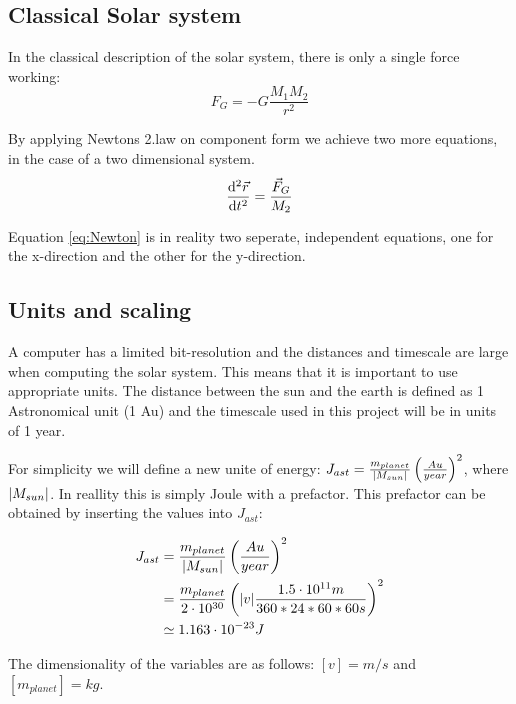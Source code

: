 






\subsection{Classical Solar system}
In the classical description of the solar system, there is only a single force working:
\begin{equation}
 F_G = - G\frac{M_{1}M_2}{r ^2} \label{eq:F_G}
\end{equation}

By applying Newtons 2.law on component form we achieve two more equations, in the case of a two dimensional system. 
\begin{equation}
\dv[2]{\vec{r	}}{t} = \frac{\vec{F}_G}{M_2} \label{eq:Newton}
\end{equation}

Equation \ref{eq:Newton} is in reality two seperate, independent equations, one for the x-direction and the other for the y-direction. 
 


\subsection{Units and scaling}

A computer has a limited bit-resolution and the distances and timescale are large when computing the solar system. This means that it is important to use appropriate units. The distance between the sun and the earth is defined as 1 Astronomical unit (1 Au) and the timescale used in this project will be in units of 1 year. 


For simplicity we will define a new unite of energy: $ J_{ast}  = \frac{m_{planet}}{\abs{M_{sun}}} \left(\frac{Au}{year}\right)^2$, where $ \abs{M_{sun}} $. In reallity this is simply Joule with a prefactor. This prefactor can be obtained by inserting the values into $ J_{ast} $:
	
	\begin{align}
J_{ast}  &= \frac{m_{planet}}{\abs{M_{sun}}}\left(\frac{Au}{year}\right)^2\\
&= \frac{m_{planet}}{2\cdot 10^{30}}	\left(\abs{v}	\frac{1.5 \cdot 10^{11}m}{360*24*60*60 s}\right)^2\\
&\simeq 1.163\cdot 10^{-23} J
\end{align}

The dimensionality of the variables are as follows:  $ [v] = m/s $ and $ [m_{planet}] = kg $.
	




